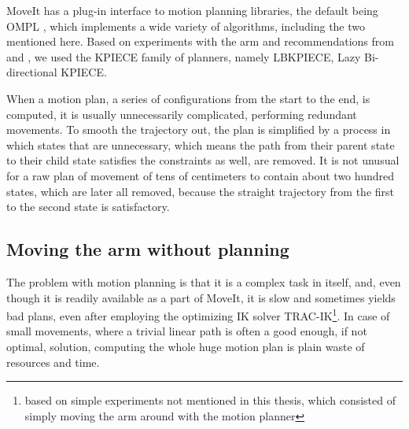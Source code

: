 \documentclass[buriama8_dp.tex]{subfiles}
\begin{document}
MoveIt has a plug-in interface to motion planning libraries, the default being OMPL \cite{ompl}, which implements a wide variety of algorithms, including the two mentioned here. Based on experiments with the arm and recommendations from \cite{vojta} and \cite{ompl}, we used the KPIECE family of planners, namely LBKPIECE, Lazy Bi-directional KPIECE.



When a motion plan, a series of configurations from the start to the end, is computed, it is usually unnecessarily complicated, performing redundant movements. To smooth the trajectory out, the plan is simplified by a process in which states that are unnecessary, which means the path from their parent state to their child state satisfies the constraints as well, are removed. It is not unusual for a raw plan of movement of tens of centimeters to contain about two hundred states, which are later all removed, because the straight trajectory from the first to the second state is satisfactory.

\subsection{Moving the arm without planning}
\label{subsec:no_plan}

The problem with motion planning is that it is a complex task in itself, and, even though it is readily available as a part of MoveIt, it is slow and sometimes yields bad plans, even after employing the optimizing IK solver TRAC-IK\footnote{based on simple experiments not mentioned in this thesis, which consisted of simply moving the arm around with the motion planner}. In case of small movements, where a trivial linear path is often a good enough, if not optimal, solution, computing the whole huge motion plan is plain waste of resources and time.
\end{document}
